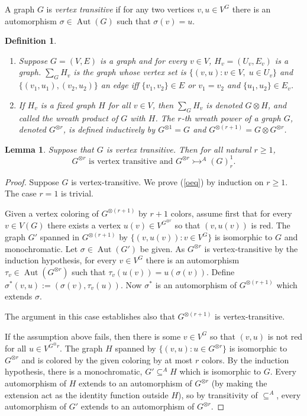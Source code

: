 \documentclass[11pt]{amsart}
\newcommand{\ars}{\rightarrowtail}
\newcommand{\su}{\subseteq}
\newcommand{\aut}{\operatorname{Aut}}
\newcommand{\id}{\operatorname{id}}
\newtheorem{lemma}[theorem]{Lemma}
\newtheorem{definition}[theorem]{Definition}
\begin{document}
A graph $G$ is \emph{vertex transitive} if for any two vertices
$v,u\in V^G$ there is an automorphism $\sigma \in \aut (G)$ such
that $\sigma(v)=u$.




\begin{definition}
\begin{enumerate}
\item Suppose $G=( V,E)$ is a graph and for every $v\in V$,
  $H_v=(U_v,E_v)$ is a graph. $\sum_G H_v$ is the graph whose
  vertex set is $\{(v,u):v\in V,\; u\in U_v\}$ and
  $\{(v_1,u_1),(v_2,u_2)\}$ an edge iff $\{v_1,v_2\}\in E$ or
  $v_1=v_2$ and $\{u_1,u_2\}\in E_v$.
\item If $H_v$ is a fixed graph $H$ for all $v\in V$, then $\sum_G H_v$
  is denoted $G\otimes H$, and called the \emph{wreath product} of $G$
  with $H$. The \emph{$r$-th wreath power} of a graph $G$, denoted
  $G^{\otimes r}$, is defined inductively by $G^{\otimes 1}=G$ and
  $G^{\otimes (r+1)}=G\otimes G^{\otimes r}$.
\end{enumerate}
\end{definition}


\begin{lemma} \label{otimes} Suppose that $G$ is vertex transitive. Then
 for all natural $r\ge 1$, 
\begin{equation}\label{oeq}
G^{\otimes r} \text{ is vertex
 transitive and } G^{\otimes r}\ars ^A (G)^1_r.
\end{equation}
\end{lemma}
\begin{proof}
  Suppose $G$ is vertex-transitive. We prove (\ref{oeq}) by induction
  on $r\ge 1$. The case $r=1$ is trivial. 


  Given a vertex coloring of $G^{\otimes (r+1)}$ by $r+1$ colors,
  assume first that for every $v\in V(G)$ there exists a vertex
  $u(v)\in V^{G^{\otimes r}}$ so that $(v,u(v))$ is red. The graph
  $G'$ spanned in $G^{\otimes (r+1)}$ by $\{(v,u(v)):v\in V^G\}$ is
  isomorphic to $G$ and monochromatic. Let $\sigma\in \aut(G')$ be
  given. As $G^{\otimes r}$ is vertex-transitive by the induction
  hypothesis, for every $v\in V^G$ there is an automorphism $\tau_v\in
  \aut(G^{\otimes r})$ such that $\tau_v(u(v))=u(\sigma(v))$. Define
  $\sigma^*(v,u):=(\sigma(v), \tau_v(u))$. Now $\sigma^*$ is an
  automorphism of $G^{\otimes(r+1)}$ which extends $\sigma$. 

  The argument in this case establishes also that $G^{\otimes(r+1)}$
  is vertex-transitive.


  If the assumption above fails, then there is some $v\in V^G$ so that
  $(v,u)$ is not red for all $u\in V^{G^\otimes r}$. The graph $H$
  spanned by $\{(v,u):u\in G^{\otimes r}\}$ is isomorphic to
  $G^{\otimes r}$ and is colored by the given coloring by at most $r$
  colors. By the induction hypothesis, there is a monochromatic,
  $G'\su^A H$ which is isomorphic to $G$. Every automorphism of $H$
  extends to an automorphism of $G^{\otimes r}$ (by making the
  extension act as the identity function outside $H$), so by
  transitivity of $\su^A$, every automorphism of $G'$ extends to an
  automorphism of $G^{\otimes r}$.
\end{proof}
\end{document}
